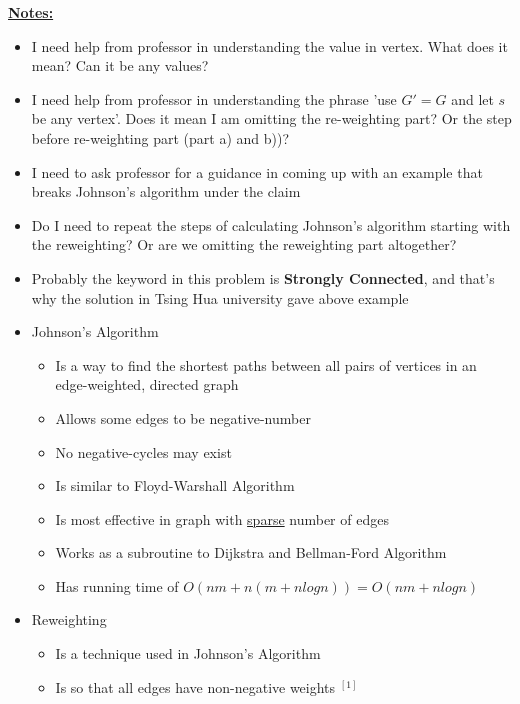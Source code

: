 \documentclass[12pt]{article}
\begin{document}
\begin{enumerate}[1.]
    \bigskip

    \underline{\textbf{Notes:}}

    \bigskip

    \begin{itemize}
        \item I need help from professor in understanding the value in vertex. What does it mean? Can it be any values?
        \item I need help from professor in understanding the phrase 'use $G'= G$ and let $s$ be any vertex'. Does it mean
        I am omitting the re-weighting part? Or the step before re-weighting part (part a) and b))?
        \item I need to ask professor for a guidance in coming up with an example that breaks Johnson's algorithm
        under the claim
        \item Do I need to repeat the steps of calculating Johnson's algorithm starting with the reweighting? Or are
        we omitting the reweighting part altogether?
        \item Probably the keyword in this problem is \textbf{Strongly Connected}, and that's why
        the solution in Tsing Hua university gave above example
        \item Johnson's Algorithm

        \begin{itemize}
            \item Is a way to find the shortest paths between all pairs of vertices
            in an edge-weighted, directed graph
            \item Allows some edges to be negative-number
            \item No negative-cycles may exist
            \item Is similar to Floyd-Warshall Algorithm
            \item Is most effective in graph with \underline{sparse} number of edges
            \item Works as a subroutine to Dijkstra and Bellman-Ford Algorithm
            \item Has running time of $O(nm + n(m + n log n)) = O(nm + nlog n)$
        \end{itemize}

        \item Reweighting
        \begin{itemize}
            \item Is a technique used in Johnson's Algorithm
            \item Is so that all edges have non-negative weights $^{[1]}$
        \end{itemize}


\end{itemize}
\end{enumerate}
\end{document}
